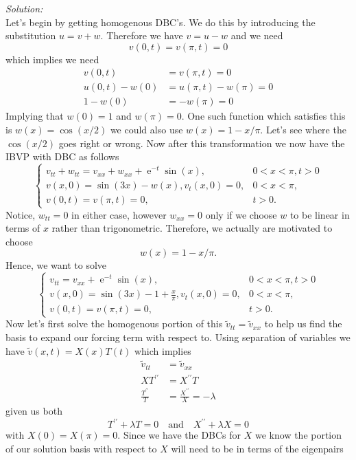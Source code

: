 \documentclass[10pt]{amsart}
\DeclareMathOperator{\E}{e}
\theoremstyle{nonumberplain}
\begin{document}
\begin{enumerate}[label={\bf {\arabic*}:}]
\noindent
\textit{Solution:} \\
Let's begin by getting homogenous DBC's.
We do this by introducing the substitution $u = v + w$.
Therefore we have $v = u - w$ and we need
$$
v(0, t) = v(\pi, t) = 0
$$
which implies we need
\begin{align*}
v(0, t) &= v(\pi, t) = 0 \\
u(0, t) - w(0) &= u(\pi, t) - w(\pi) = 0 \\
1 - w(0) &= - w(\pi) = 0
\end{align*}
Implying that $w(0) = 1$ and $w(\pi) = 0$.
One such function which satisfies this is $w(x) = \cos(x/2)$ we could also use $w(x) = 1 - x/\pi$.
Let's see where the $\cos(x/2)$ goes right or wrong.
Now after this transformation we now have the IBVP with DBC as follows
$$
\begin{cases}
v_{tt} + w_{tt} = v_{xx} + w_{xx} + \E^{-t}\sin(x), & 0 < x < \pi, t > 0 \\
v(x, 0) = \sin(3x) - w(x), v_t(x, 0) = 0, & 0 < x < \pi, \\
v(0, t) = v(\pi, t) = 0, & t > 0.
\end{cases}
$$
Notice, $w_{tt} = 0$ in either case, however $w_{xx} = 0$ only if we choose $w$ to be linear in terms of $x$ rather than trigonometric.
Therefore, we actually are motivated to choose
$$
w(x) = 1 - x/\pi.
$$
Hence, we want to solve
$$
\begin{cases}
v_{tt} = v_{xx} + \E^{-t}\sin(x), & 0 < x < \pi, t > 0 \\
v(x, 0) = \sin(3x) - 1 + \frac x \pi, v_t(x, 0) = 0, & 0 < x < \pi, \\
v(0, t) = v(\pi, t) = 0, & t > 0.
\end{cases}
$$
Now let's first solve the homogenous portion of this $\tilde v_{tt} = \tilde v_{xx}$ to help us find the basis to expand our forcing term with respect to.
Using separation of variables we have $\tilde v(x, t) = X(x)T(t)$ which implies
\begin{align*}
\tilde v_{tt} &= \tilde v_{xx} \\
XT^{\prime\prime} &= X^{\prime\prime}T \\
\frac {T^{\prime\prime}} T &= \frac{X^{\prime\prime}} X = -\lambda
\end{align*}
given us both
$$
T^{\prime\prime} + \lambda T = 0 \quad \text{and} \quad X^{\prime\prime} + \lambda X = 0
$$
with $X(0) = X(\pi) = 0$.
Since we have the DBCs for $X$ we know the portion of our solution basis with respect to $X$ will need to be in terms of the eigenpairs
$$
$$
\end{enumerate}
\end{document}

